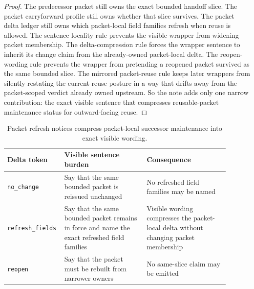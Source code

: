 \documentclass[11pt]{article}
\begin{document}
\begin{proof}
The predecessor packet still owns the exact bounded handoff slice.
The packet carryforward profile still owns whether that slice survives.
The packet delta ledger still owns which packet-local field families refresh when reuse is allowed.
The sentence-locality rule prevents the visible wrapper from widening packet membership.
The delta-compression rule forces the wrapper sentence to inherit its change claim from the already-owned packet-local delta.
The reopen-wording rule prevents the wrapper from pretending a reopened packet survived as the same bounded slice.
The mirrored packet-reuse rule keeps later wrappers from silently restating the current reuse posture in a way that drifts away from the packet-scoped verdict already owned upstream.
So the note adds only one narrow contribution: the exact visible sentence that compresses reusable-packet maintenance status for outward-facing reuse.\qedhere
\end{proof}

\begin{table}[t]
\centering
\small
\begin{tabularx}{\linewidth}{@{}p{0.18\linewidth} p{0.36\linewidth} p{0.36\linewidth}@{}}
\toprule
Delta token & Visible sentence burden & Consequence \\
\midrule
\texttt{no\_change} & Say that the same bounded packet is reissued unchanged & No refreshed field families may be named \\
\texttt{refresh\_fields} & Say that the same bounded packet remains in force and name the exact refreshed field families & Visible wording compresses the packet-local delta without changing packet membership \\
\texttt{reopen} & Say that the packet must be rebuilt from narrower owners & No same-slice claim may be emitted \\
\bottomrule
\end{tabularx}
\caption{Packet refresh notices compress packet-local successor maintenance into exact visible wording.}
\label{tab:publicrequestresponsepacketrefreshnotices}
\end{table}
\end{document}
